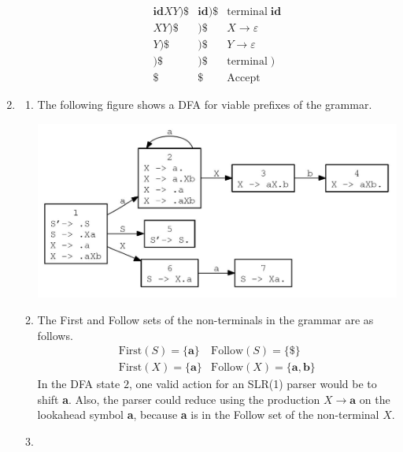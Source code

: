 \documentclass[11pt]{article}
\begin{document}
\begin{enumerate}
\begin{enumerate}
\[\begin{array}{lll}
						\mathbf{id} XY \textbf{)} \textbf{\$} & \textbf{id)\$}
						& \mathrm{terminal} \; \mathbf{id} \\
						XY \textbf{)} \textbf{\$} & \textbf{)\$}
						& X \rightarrow \varepsilon \\
						Y \textbf{)} \textbf{\$} & \textbf{)\$}
						& Y \rightarrow \varepsilon \\
						\textbf{)} \textbf{\$} & \textbf{)\$}
						& \mathrm{terminal} \; \textbf{)} \\
						\textbf{\$} & \textbf{\$} & \mathrm{Accept}
					\end{array}
				\]
		\end{enumerate}
	
	\item
		\begin{enumerate}
			\item The following figure shows a DFA for viable prefixes of the grammar.
				\begin{center}
					\includegraphics[scale=0.5]{viable-prefix-dfa.jpg}
				\end{center}
			\item The First and Follow sets of the non-terminals in the grammar are as follows.
				\[
					\begin{array}{ll}
						\mathrm{First}(S) = \{ \mathbf{a} \}
						& \mathrm{Follow}(S) = \{ \textbf{\$} \} \\
						\mathrm{First}(X) = \{ \textbf{a} \}
						& \mathrm{Follow}(X) = \{ \textbf{a}, \textbf{b} \}
					\end{array}
				\]
				In the DFA state $2$, one valid action for an SLR(1) parser would be
				to shift \textbf{a}.  Also, the parser could reduce using the
				production $X \rightarrow \textbf{a}$ on the lookahead symbol
				\textbf{a}, because \textbf{a} is in the Follow set of the
				non-terminal $X$.
			\item
				\[
\]
\end{enumerate}
\end{enumerate}
\end{document}
